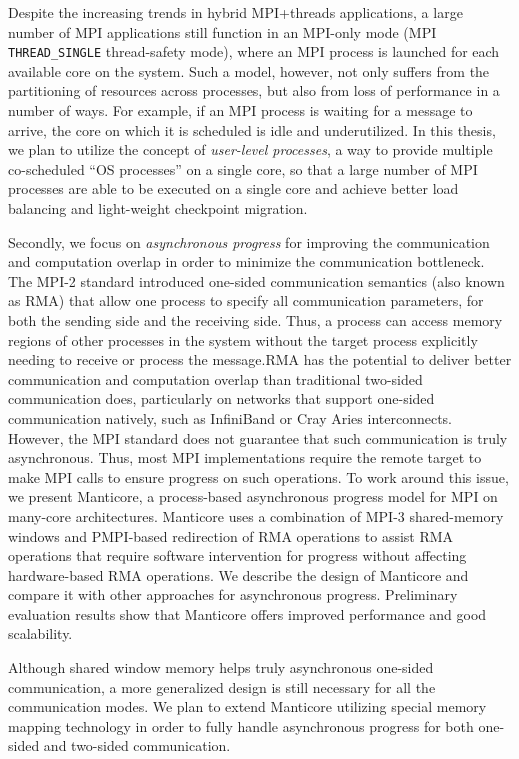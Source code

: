Despite the increasing trends in hybrid MPI+threads applications,
a large number of MPI applications still function in an MPI-only 
mode (MPI \texttt{THREAD\_SINGLE} thread-safety mode), where an MPI 
process is launched for each available core on the system. Such a model, 
however, not only suffers from the partitioning of resources across 
processes, but also from loss of performance in a number of ways. For 
example, if an MPI process is waiting for a message to arrive, the 
core on which it is scheduled is idle and underutilized. In this 
thesis, we plan to utilize the concept of \textit{user-level processes}, 
a way to provide multiple co-scheduled ``OS processes'' on a single core, 
so that a large number of MPI processes are able to be executed on a 
single core and achieve better load balancing and light-weight 
checkpoint migration.

Secondly, we focus on \textit{asynchronous progress} for improving 
the communication and computation overlap in order to minimize 
the communication bottleneck. 
The MPI-2 standard introduced one-sided communication semantics 
(also known as RMA) that allow one process to specify all communication 
parameters, for both the sending side and the receiving side. Thus, a 
process can access memory regions of other processes in the system 
without the target process explicitly needing to receive or process 
the message.RMA has the potential to deliver better communication and 
computation overlap than traditional two-sided communication does, 
particularly on networks that support one-sided communication natively, 
such as InfiniBand or Cray Aries interconnects. However, the MPI standard 
does not guarantee that such communication is truly asynchronous. Thus, 
most MPI implementations require the remote target to make MPI calls 
to ensure progress on such operations. To work around this issue, we 
present Manticore, a process-based asynchronous progress model 
for MPI on many-core architectures. Manticore uses a combination 
of MPI-3 shared-memory windows and PMPI-based redirection of RMA 
operations to assist RMA operations that require software intervention 
for progress without affecting hardware-based RMA operations.  We 
describe the design of Manticore and compare it with other approaches 
for asynchronous progress. Preliminary evaluation results show that 
Manticore offers improved performance and good scalability.

Although shared window memory helps truly asynchronous one-sided 
communication, a more generalized design is still necessary for all the 
communication modes. We plan to extend Manticore utilizing special memory 
mapping technology in order to fully handle asynchronous progress for 
both one-sided and two-sided communication.

\clearpage

